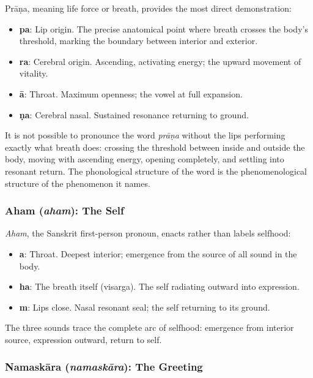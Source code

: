 \documentclass[12pt]{article}
\begin{document}
Pr\={a}\d{n}a, meaning life force or breath, provides the most direct demonstration:

\begin{itemize}[leftmargin=2em]
  \item \textbf{pa}: Lip origin. The precise anatomical point where breath crosses the body's threshold, marking the boundary between interior and exterior.
  \item \textbf{ra}: Cerebral origin. Ascending, activating energy; the upward movement of vitality.
  \item \textbf{\={a}}: Throat. Maximum openness; the vowel at full expansion.
  \item \textbf{\d{n}a}: Cerebral nasal. Sustained resonance returning to ground.
\end{itemize}

It is not possible to pronounce the word \textit{pr\={a}\d{n}a} without the lips performing exactly what breath does: crossing the threshold between inside and outside the body, moving with ascending energy, opening completely, and settling into resonant return. The phonological structure of the word is the phenomenological structure of the phenomenon it names.

\subsubsection{Aham (\textit{aham}): The Self}

\textit{Aham}, the Sanskrit first-person pronoun, enacts rather than labels selfhood:

\begin{itemize}[leftmargin=2em]
  \item \textbf{a}: Throat. Deepest interior; emergence from the source of all sound in the body.
  \item \textbf{ha}: The breath itself (visarga). The self radiating outward into expression.
  \item \textbf{m}: Lips close. Nasal resonant seal; the self returning to its ground.
\end{itemize}

The three sounds trace the complete arc of selfhood: emergence from interior source, expression outward, return to self.

\subsubsection{Namask\={a}ra (\textit{namask\={a}ra}): The Greeting}
\end{document}
